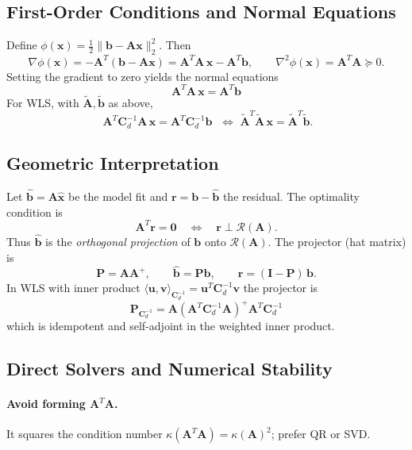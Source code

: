 \documentclass[11pt,a4paper]{article}
\begin{document}
\subsection{First-Order Conditions and Normal Equations}
Define $\phi(\mathbf{x})=\tfrac12\|\mathbf{b}-\mathbf{A}\mathbf{x}\|_2^2$. Then
\[
\nabla\phi(\mathbf{x}) = -\mathbf{A}^T(\mathbf{b}-\mathbf{A}\mathbf{x}) = \mathbf{A}^T\mathbf{A}\,\mathbf{x}-\mathbf{A}^T\mathbf{b},\qquad
\nabla^2\phi(\mathbf{x})=\mathbf{A}^T\mathbf{A} \succeq 0.
\]
Setting the gradient to zero yields the normal equations
\[
\boxed{\;\mathbf{A}^T\mathbf{A}\,\mathbf{x}=\mathbf{A}^T\mathbf{b}\;}
\]
For WLS, with $\tilde{\mathbf{A}},\tilde{\mathbf{b}}$ as above,
\[
\boxed{\;\mathbf{A}^T\mathbf{C}_d^{-1}\mathbf{A}\,\mathbf{x}=\mathbf{A}^T\mathbf{C}_d^{-1}\mathbf{b}\;}\,\,\iff\,\,\tilde{\mathbf{A}}^T\tilde{\mathbf{A}}\,\mathbf{x}=\tilde{\mathbf{A}}^T\tilde{\mathbf{b}}.
\]

\subsection{Geometric Interpretation}
Let $\widehat{\mathbf{b}}=\mathbf{A}\widehat{\mathbf{x}}$ be the model fit and $\mathbf{r}=\mathbf{b}-\widehat{\mathbf{b}}$ the residual. The optimality condition is
\[
\mathbf{A}^T\mathbf{r}=\mathbf{0}\quad\iff\quad\mathbf{r}\perp\mathcal{R}(\mathbf{A}).
\]
Thus $\widehat{\mathbf{b}}$ is the \emph{orthogonal projection} of $\mathbf{b}$ onto $\mathcal{R}(\mathbf{A})$. The projector (hat matrix) is
\[
\mathbf{P}=\mathbf{A}\mathbf{A}^+,\qquad \widehat{\mathbf{b}}=\mathbf{P}\mathbf{b},\qquad \mathbf{r}=(\mathbf{I}-\mathbf{P})\,\mathbf{b}.
\]
In WLS with inner product $\langle \mathbf{u},\mathbf{v}\rangle_{\mathbf{C}_d^{-1}}=\mathbf{u}^T\mathbf{C}_d^{-1}\mathbf{v}$ the projector is
\[
\boxed{\;\mathbf{P}_{\mathbf{C}_d^{-1}}=\mathbf{A}(\mathbf{A}^T\mathbf{C}_d^{-1}\mathbf{A})^+\mathbf{A}^T\mathbf{C}_d^{-1}\;}
\]
which is idempotent and self-adjoint in the weighted inner product.

\subsection{Direct Solvers and Numerical Stability}
\paragraph{Avoid forming $\mathbf{A}^T\mathbf{A}$.} It squares the condition number $\kappa(\mathbf{A}^T\mathbf{A})=\kappa(\mathbf{A})^2$; prefer QR or SVD.
\end{document}

